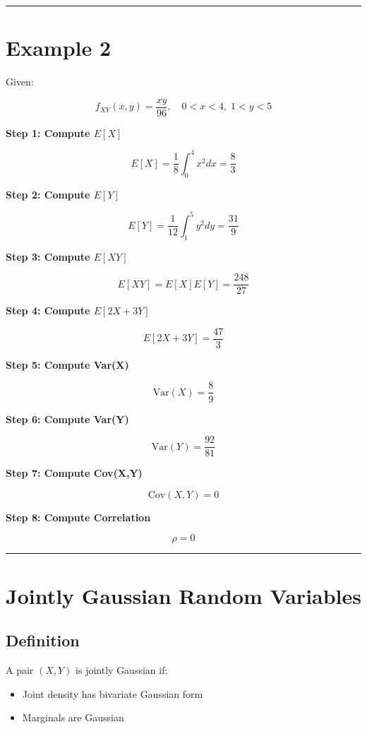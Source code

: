 \documentclass[12pt]{article}
\begin{document}
\hrule
\vspace{0.5cm}

\section{Example 2}

Given:

\[
f_{XY}(x,y) = \frac{xy}{96}, \quad 0 < x < 4, \; 1 < y < 5
\]

\textbf{Step 1: Compute $E[X]$}

\[
E[X] = \frac{1}{8} \int_0^4 x^2 dx = \frac{8}{3}
\]

\textbf{Step 2: Compute $E[Y]$}

\[
E[Y] = \frac{1}{12} \int_1^5 y^2 dy = \frac{31}{9}
\]

\textbf{Step 3: Compute $E[XY]$}

\[
E[XY] = E[X]E[Y] = \frac{248}{27}
\]

\textbf{Step 4: Compute $E[2X + 3Y]$}

\[
E[2X + 3Y] = \frac{47}{3}
\]

\textbf{Step 5: Compute Var(X)}

\[
\mathrm{Var}(X) = \frac{8}{9}
\]

\textbf{Step 6: Compute Var(Y)}

\[
\mathrm{Var}(Y) = \frac{92}{81}
\]

\textbf{Step 7: Compute Cov(X,Y)}

\[
\mathrm{Cov}(X,Y) = 0
\]

\textbf{Step 8: Compute Correlation}

\[
\rho = 0
\]

\hrule
\vspace{0.5cm}

\section{Jointly Gaussian Random Variables}

\subsection{Definition}

A pair $(X,Y)$ is jointly Gaussian if:

\begin{itemize}
\item Joint density has bivariate Gaussian form
\item Marginals are Gaussian
\end{itemize}
\end{document}
